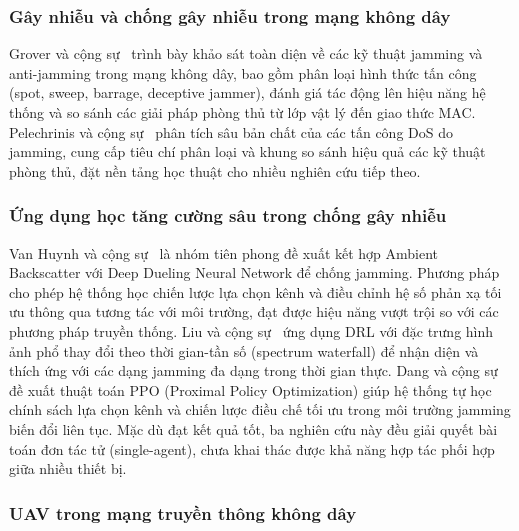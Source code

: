 \subsubsection*{Gây nhiễu và chống gây nhiễu trong mạng không dây}

Grover và cộng sự~\cite{grover2014jamming} trình bày khảo sát toàn diện về các kỹ thuật
jamming và anti-jamming trong mạng không dây, bao gồm phân loại hình thức tấn công (spot,
sweep, barrage, deceptive jammer), đánh giá tác động lên hiệu năng hệ thống và so sánh các
giải pháp phòng thủ từ lớp vật lý đến giao thức MAC. Pelechrinis và cộng sự~\cite{pelechrinis2011dos}
phân tích sâu bản chất của các tấn công DoS do jamming, cung cấp tiêu chí phân loại và khung
so sánh hiệu quả các kỹ thuật phòng thủ, đặt nền tảng học thuật cho nhiều nghiên cứu tiếp theo.

\subsubsection*{Ứng dụng học tăng cường sâu trong chống gây nhiễu}

Van Huynh và cộng sự~\cite{huynh2019jam} là nhóm tiên phong đề xuất kết hợp Ambient
Backscatter với Deep Dueling Neural Network để chống jamming. Phương pháp cho phép hệ thống
học chiến lược lựa chọn kênh và điều chỉnh hệ số phản xạ tối ưu thông qua tương tác với
môi trường, đạt được hiệu năng vượt trội so với các phương pháp truyền thống. Liu và cộng
sự~\cite{liu2018antijamming} ứng dụng DRL với đặc trưng hình ảnh phổ thay đổi theo thời
gian-tần số (spectrum waterfall) để nhận diện và thích ứng với các dạng jamming đa dạng trong
thời gian thực. Dang và cộng sự~\cite{dang2024ppo} đề xuất thuật toán PPO (Proximal Policy
Optimization) giúp hệ thống tự học chính sách lựa chọn kênh và chiến lược điều chế tối ưu
trong môi trường jamming biến đổi liên tục. Mặc dù đạt kết quả tốt, ba nghiên cứu này đều
giải quyết bài toán đơn tác tử (single-agent), chưa khai thác được khả năng hợp tác phối
hợp giữa nhiều thiết bị.

\subsubsection*{UAV trong mạng truyền thông không dây}

